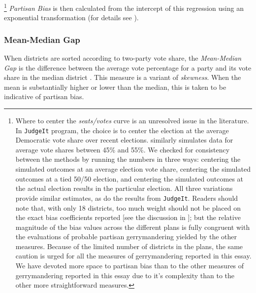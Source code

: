         \footnote{Where to center the \textit{seats/votes} curve is an unresolved issue in the literature. In \citet{GelmanKing1994_unifiedAJPS} \texttt{JudgeIt} program, the choice is to center the election at the average Democratic vote share over recent elections. \citet{Kastellec_et_al_2008_PS} similarly simulates data for average vote shares between 45\% and 55\%. We checked for consistency between the methods by running the numbers in three ways: centering the simulated outcomes at an average election vote share, centering the simulated outcomes at a tied 50/50 election, and centering the simulated outcomes at the actual election results in the particular election. All three variations provide similar estimates, as do the results from \texttt{JudgeIt}. Readers should note that, with only 18 districts, too much weight should not be placed on the exact bias coefficients reported [see the discussion in \citet{Browning_King_1987_seats_votes}]; but the relative magnitude of the bias values across the different plans is fully congruent with the evaluations of probable partisan gerrymandering yielded by the other measures. Because of the limited number of districts in the plans, the same caution is urged for all the measures of gerrymandering reported in this essay. We have devoted more space to partisan bias than to the other measures of gerrymandering reported in this essay due to it's complexity than to the other more straightforward measures.} 
    \textit{Partisan Bias} is then calculated from the intercept of this regression using an exponential transformation (for details see \citet{Grofman1983}).
\par
            \subsubsection*{Mean-Median Gap}
    When districts are sorted according to two-party vote share, the \textit{Mean-Median Gap} is the difference between the average vote percentage for a party and its vote share in the median district \citep[see][]{Best2018}. This measure is a variant of \textit{skewness}. When the mean is substantially higher or lower than the median, this is taken to be indicative of partisan bias.
\par
